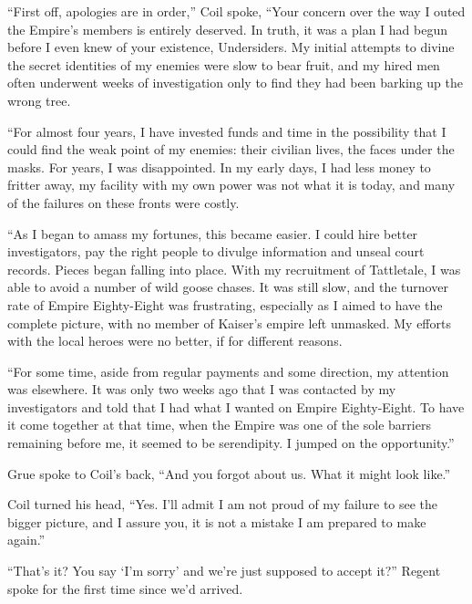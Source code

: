 ``First off, apologies are in order,'' Coil spoke, ``Your concern over the way I outed the Empire's members is entirely deserved.  In truth, it was a plan I had begun before I even knew of your existence, Undersiders.  My initial attempts to divine the secret identities of my enemies were slow to bear fruit, and my hired men often underwent weeks of investigation only to find they had been barking up the wrong tree.



``For almost four years, I have invested funds and time in the possibility that I could find the weak point of my enemies: their civilian lives, the faces under the masks.  For years, I was disappointed.  In my early days, I had less money to fritter away, my facility with my own power was not what it is today, and many of the failures on these fronts were costly.



``As I began to amass my fortunes, this became easier.  I could hire better investigators, pay the right people to divulge information and unseal court records.  Pieces began falling into place.  With my recruitment of Tattletale, I was able to avoid a number of wild goose chases.  It was still slow, and the turnover rate of Empire Eighty-Eight was frustrating, especially as I aimed to have the complete picture, with no member of Kaiser's empire left unmasked.  My efforts with the local heroes were no better, if for different reasons.



``For some time, aside from regular payments and some direction, my attention was elsewhere.  It was only two weeks ago that I was contacted by my investigators and told that I had what I wanted on Empire Eighty-Eight.  To have it come together at that time, when the Empire was one of the sole barriers remaining before me, it seemed to be serendipity.  I jumped on the opportunity.''



Grue spoke to Coil's back, ``And you forgot about us.  What it might look like.''



Coil turned his head, ``Yes.  I'll admit I am not proud of my failure to see the bigger picture, and I assure you, it is not a mistake I am prepared to make again.''



``That's it?  You say `I'm sorry' and we're just supposed to accept it?'' Regent spoke for the first time since we'd arrived.



